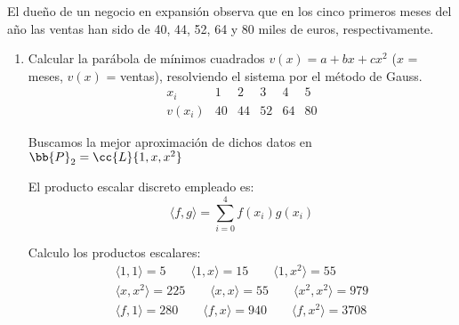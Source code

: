 \begin{ejercicio}
    El dueño de un negocio en expansión observa que en los cinco primeros meses del año las ventas han sido de 40, 44, 52, 64 y 80 miles de euros, respectivamente.
    \begin{enumerate}
        \item Calcular la parábola de mínimos cuadrados $v(x) = a + bx + cx^2$ ($x$ = meses, $v(x)$ = ventas), resolviendo el sistema por el método de Gauss.
        \begin{equation*}
            \begin{array}{c|ccccc}
                x_i & 1 & 2 & 3 & 4 & 5 \\ \hline
                v(x_i) & 40 & 44 & 52 & 64 & 80
            \end{array}
        \end{equation*}

        Buscamos la mejor aproximación de dichos datos en $\bb{P}_2 = \cc{L}\{1,x,x^2\}$

        El producto escalar discreto empleado es:
        \begin{equation*}
            \langle f,g\rangle = \sum_{i=0}^4 f(x_i)g(x_i)
        \end{equation*}
    
        Calculo los productos escalares:
        \begin{gather*}
            \langle 1,1 \rangle = 5
            \qquad
            \langle 1,x \rangle = 15
            \qquad
            \langle 1,x^2 \rangle = 55
            \\
            \langle x,x^2 \rangle = 225
            \qquad
            \langle x,x \rangle = 55
            \qquad
            \langle x^2,x^2 \rangle = 979
            \\
            \langle f,1\rangle = 280
            \qquad
            \langle f,x \rangle = 940
            \qquad
            \langle f,x^2 \rangle = 3708
        \end{gather*}
    

\end{enumerate}
\end{ejercicio}
